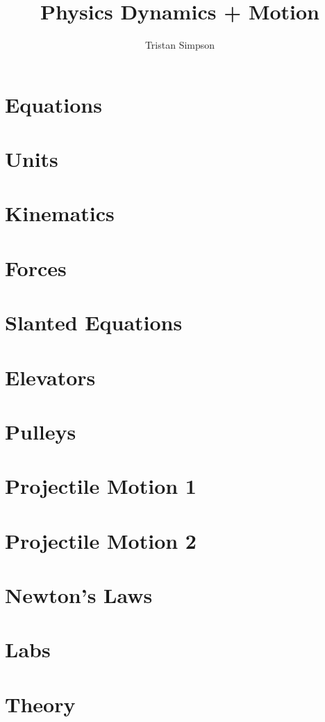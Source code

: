 \documentclass{article}
\title{Physics Dynamics + Motion}
\author{Tristan Simpson}
\begin{document}
\maketitle

\section{Equations}

\section{Units}

\section{Kinematics}

\section{Forces}

\section{Slanted Equations}

\section{Elevators}

\section{Pulleys}

\section{Projectile Motion 1}

\section{Projectile Motion 2}

\section{Newton's Laws}

\section{Labs}

\section{Theory}
\end{document}
